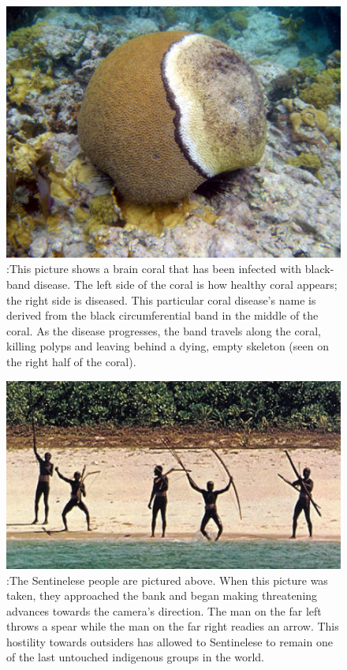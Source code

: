 \documentclass{book}\usepackage{knitr}
\begin{document}
\begin{knitrout}
\begin{kframe}
{\begin{figure}
\includegraphics[width=\linewidth]{images/coraldisease}
\caption{:This picture shows a brain coral that has been infected with black-band disease. The left side of the coral is how healthy coral appears; the right side is diseased. This particular coral disease’s name is derived from the black circumferential band in the middle of the coral. As the disease progresses, the band travels along the coral, killing polyps and leaving behind a dying, empty skeleton (seen on the right half of the coral).}
\label{fig:Black Band Disease}
\end{figure}

\begin{figure}
\includegraphics[width=\linewidth]{images/sentpeeps}
\caption{:The Sentinelese people are pictured above. When this picture was taken, they approached the bank and began making threatening advances towards the camera’s direction. The man on the far left throws a spear while the man on the far right readies an arrow. This hostility towards outsiders has allowed to Sentinelese to remain one of the last untouched indigenous groups in the world.}
\label{fig:An Interaction with The Sentinelese People }
\end{figure}

}
\end{kframe}
\end{knitrout}
\end{document}
